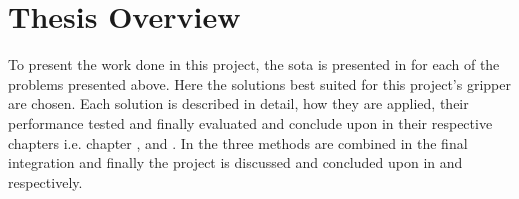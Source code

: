 




\section{Thesis Overview}\label{sec:intro-thesis-overview}

To present the work done in this project, the \gls{sota} is presented in  for each of the problems presented above. Here the solutions best suited for this project's gripper are chosen. Each solution is described in detail, how they are applied, their performance tested and finally evaluated and conclude upon in their respective chapters i.e. chapter ,  and . In  the three methods are combined in the final integration and finally the project is discussed and concluded upon in  and  respectively.




































